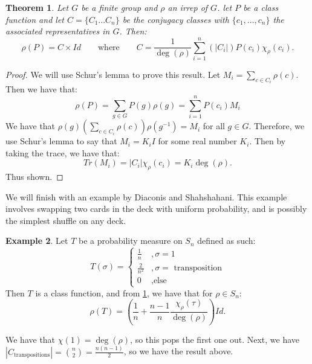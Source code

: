 \documentclass[]{article}
\newtheorem{theorem}{Theorem}
\theoremstyle{definition}
\newtheorem{example}[theorem]{Example}
\numberwithin{theorem}{section}
\numberwithin{equation}{section}
\begin{document}
\begin{theorem}\label{thm:class_fns}
	Let $G$ be a finite group and $\rho$ an irrep of $G$. let $P$ be a class function and let $C = \lbrace C_1... C_n \rbrace$ be the conjugacy classes with $\lbrace c_1, ..., c_n \rbrace$ the associated representatives in $G$. Then:
	\begin{equation}
		\rho(P) = C \times Id \qquad \text{where} \qquad C = \frac{1}{\deg(\rho)}  \sum_{i = 1}^n\left(|C_i|\right) P(c_i) \chi_\rho(c_i).
	\end{equation}
\end{theorem}
\begin{proof}
	We will use Schur's lemma to prove this result. 
	Let $M_i = \sum_{c \in C_i} \rho(c)$. Then we have that:
	\begin{equation}
		\rho(P) = \sum_{g \in G} P(g) \rho(g) = \sum_{i = 1}^n P(c_i) M_i
	\end{equation}
	We have that $\rho(g) \left(\sum_{c \in C_i} \rho(c)\right) \rho(g^{-1}) = M_i$ for all $g \in G$. Therefore, we use Schur's lemma to say that $M_i = K_i I$ for some real number $K_i$. Then by taking the trace, we have that:
	\begin{equation}
		Tr(M_i) = |C_i| \chi_\rho(c_i) = K_i \deg(\rho).
	\end{equation}
	Thus shown. 
\end{proof}
We will finish with an example by Diaconis and Shahshahani. This example involves swapping two cards in the deck with uniform probability, and is possibly the simplest shuffle on any deck. \cite{diaconisGeneratingRandomPermutation1981}
\begin{example}\label{ex:swap two cards}
	Let $T$ be a probability measure on $S_n$ defined as such:
	\begin{equation}
		T(\sigma) = \begin{cases}
			\frac{1}{n} &, \sigma = 1\\
			\frac{2}{n^2} &, \sigma = \text{ transposition}\\
			0 &, \text{else}
		\end{cases}
	\end{equation}
	Then $T$ is a class function, and from \cref{thm:class_fns}, we have that for $\rho \in S_n$:
	\begin{equation}
		\rho(T) = \left(\frac{1}{n} + \frac{n-1}{n} \frac{\chi_\rho(\tau)}{\deg(\rho)}\right) Id.
	\end{equation}
\end{example}
We have that $\chi(1) = \deg(\rho)$, so this pops the first one out. Next, we have $|C_{\text{transpositions}}| = \binom{n}{2} = \frac{n(n-1)}{2}$, so we have the result above.
\end{document}
